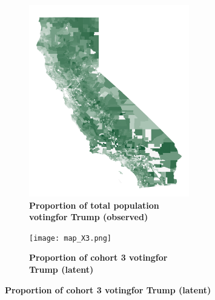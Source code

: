 \documentclass[twoside,11pt]{article}
\begin{document}
\begin{figure}[p]
    \begin{subfigure}{\textwidth}
        \begin{subfigure}{.45\textwidth}
            \includegraphics[width=\textwidth]{map_obs28.png}
            \caption*{\centering \footnotesize \textbf{Proportion of total population voting\newline for Trump (observed)}}
        \end{subfigure}
        \hfill
        \begin{subfigure}{.45\textwidth}
            \texttt{[image: map\_X3.png]}
            \caption*{\centering \footnotesize \textbf{Proportion of cohort 3 voting\newline for Trump (latent)}}
        \end{subfigure}
    \end{subfigure}
    \vspace{10px}
    \begin{subfigure}{\textwidth}
        \begin{subfigure}{.45\textwidth}

\end{subfigure}
\end{subfigure}
\end{figure}
\end{document}
